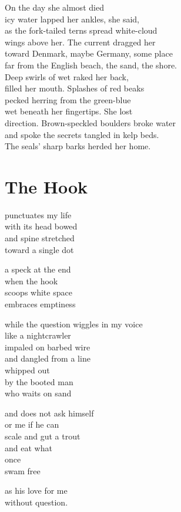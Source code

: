 \documentclass[twoside,10pt]{book}
\begin{document}
On the day she almost died\\
icy water lapped her ankles, she said,\\
as the fork-tailed terns spread white-cloud\\
wings above her. The current dragged her\\
toward Denmark, maybe Germany, some place\\
far from the English beach, the sand, the shore.\\
Deep swirls of wet raked her back,\\
filled her mouth. Splashes of red beaks\\
pecked herring from the green-blue\\
wet beneath her fingertips. She lost\\
direction. Brown-speckled boulders broke water\\
and spoke the secrets tangled in kelp beds.\\
The seals' sharp barks herded her home.


\clearpage
\section{The Hook}

punctuates my life\\
with its head bowed\\
and spine stretched\\
toward a single dot

a speck at the end\\
when the hook\\
scoops white space\\
embraces emptiness

while the question wiggles in my voice\\
like a nightcrawler\\
impaled on barbed wire\\
and dangled from a line\\
whipped out\\
by the booted man\\
who waits on sand

and does not ask himself\\
or me if he can\\
scale and gut a trout\\
and eat what\\
once\\
swam free

as his love for me\\
without question.
\end{document}
